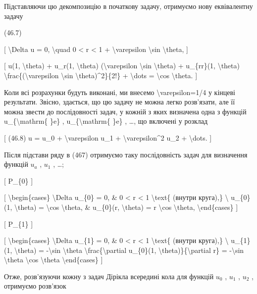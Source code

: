 \documentclass[
]{article}
\begin{document}
{Підставляючи цю декомпозицію в початкову задачу, отримуємо нову
еквівалентну задачу

(46.7)

{[} \textbackslash Delta u = 0, \textbackslash quad 0 \textless{} r
\textless{} 1 + \textbackslash varepsilon \textbackslash sin
\textbackslash theta, {]}

{[} u(1, \textbackslash theta) + u\_r(1, \textbackslash theta)
(\textbackslash varepsilon \textbackslash sin \textbackslash theta) +
u\_\{rr\}(1, \textbackslash theta)
\textbackslash frac\{(\textbackslash varepsilon \textbackslash sin
\textbackslash theta)\^{}2\}\{2!\} + \textbackslash dots =
\textbackslash cos \textbackslash theta. {]}

Коли всі розрахунки будуть виконані, ми внесемо
\textbackslash varepsilon=1/4 у кінцеві результати. Звісно, здається, що
цю задачу не можна легко розв'язати, але її можна звести до
послідовності задач, у кожній з яких визначена одна з функцій
u\_\{\textbackslash mathrm\{ \}e\} , u\_\{\textbackslash mathrm\{ \}e\}
, \ldots, що включені у розклад

{[} (46.8) u = u\_0 + \textbackslash varepsilon u\_1 +
\textbackslash varepsilon\^{}2 u\_2 + \textbackslash dots. {]}

Після підстави ряду в (467) отримуємо таку послідовність задач для
визначення функцій \(u_a\) , \(u_1\) , \ldots;

{[} P\_\{0\} {]}

{[} \textbackslash begin\{cases\} \textbackslash Delta u\_\{0\} = 0, \&
0 \textless{} r \textless{} 1 \textbackslash text\{ (внутри круга),\}
\textbackslash{} u\_\{0\}(1, \textbackslash theta) = \textbackslash cos
\textbackslash theta, \& u\_\{0\}(r, \textbackslash theta) = r
\textbackslash cos \textbackslash theta, \textbackslash end\{cases\} {]}

{[} P\_\{1\} {]}

{[} \textbackslash begin\{cases\} \textbackslash Delta u\_\{1\} = 0, \&
0 \textless{} r \textless{} 1 \textbackslash text\{ (внутри круга),\}
\textbackslash{} u\_\{1\}(1, \textbackslash theta) = -\textbackslash sin
\textbackslash theta \textbackslash frac\{\textbackslash partial
u\_\{0\}(1, \textbackslash theta)\}\{\textbackslash partial r\} =
-\textbackslash sin \textbackslash theta \textbackslash cos
\textbackslash theta \textbackslash end\{cases\} {]}

Отже, розв'язуючи кожну з задач Дірікла всередині кола для функцій
\(u_0\) , \(u_1\) , \(u_2\) , отримуємо розв'язок

}
\end{document}
